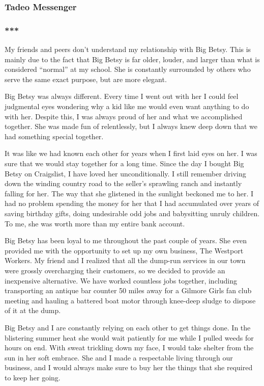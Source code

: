 \hypertarget{tadeo-messenger}{%
\subsubsection{Tadeo Messenger}\label{tadeo-messenger}}

\hypertarget{-2}{%
\subsubsection{***}\label{-2}}

My friends and peers don't understand my relationship with Big Betsy.
This is mainly due to the fact that Big Betsy is far older, louder, and
larger than what is considered ``normal'' at my school. She is
constantly surrounded by others who serve the same exact purpose, but
are more elegant.

Big Betsy was always different. Every time I went out with her I could
feel judgmental eyes wondering why a kid like me would even want
anything to do with her. Despite this, I was always proud of her and
what we accomplished together. She was made fun of relentlessly, but I
always knew deep down that we had something special together.

It was like we had known each other for years when I first laid eyes on
her. I was sure that we would stay together for a long time. Since the
day I bought Big Betsy on Craigslist, I have loved her unconditionally.
I still remember driving down the winding country road to the seller's
sprawling ranch and instantly falling for her. The way that she
glistened in the sunlight beckoned me to her. I had no problem spending
the money for her that I had accumulated over years of saving birthday
gifts, doing undesirable odd jobs and babysitting unruly children. To
me, she was worth more than my entire bank account.

Big Betsy has been loyal to me throughout the past couple of years. She
even provided me with the opportunity to set up my own business, The
Westport Workers. My friend and I realized that all the dump-run
services in our town were grossly overcharging their customers, so we
decided to provide an inexpensive alternative. We have worked countless
jobs together, including transporting an antique bar counter 50 miles
away for a Gilmore Girls fan club meeting and hauling a battered boat
motor through knee-deep sludge to dispose of it at the dump.

Big Betsy and I are constantly relying on each other to get things done.
In the blistering summer heat she would wait patiently for me while I
pulled weeds for hours on end. With sweat trickling down my face, I
would take shelter from the sun in her soft embrace. She and I made a
respectable living through our business, and I would always make sure to
buy her the things that she required to keep her going.

